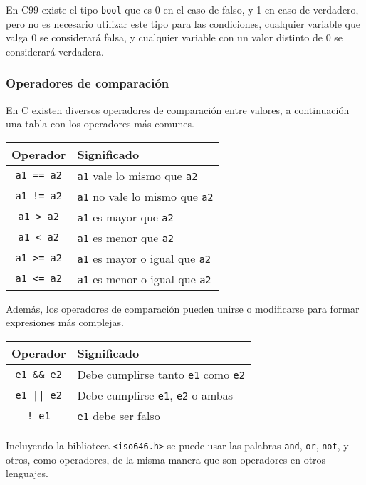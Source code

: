 En C99 existe el tipo \lstinline!bool! que es 0 en el caso de falso, y 1 en
caso de verdadero, pero no es necesario utilizar este tipo para las
condiciones, cualquier variable que valga 0 se considerará falsa, y cualquier
variable con un valor distinto de 0 se considerará verdadera.

\subsubsection{Operadores de comparación}

En C existen diversos operadores de comparación entre valores, a continuación
una tabla con los operadores más comunes.

\begin{tabular}{cl}
Operador & Significado \\
\hline
\lstinline!a1 == a2! & \lstinline!a1! vale lo mismo que \lstinline!a2! \\
\lstinline|a1 != a2| & \lstinline!a1! no vale lo mismo que \lstinline!a2! \\
\lstinline!a1 > a2! & \lstinline!a1! es mayor que \lstinline!a2! \\
\lstinline!a1 < a2! & \lstinline!a1! es menor que \lstinline!a2! \\
\lstinline!a1 >= a2! & \lstinline!a1! es mayor o igual que \lstinline!a2! \\
\lstinline!a1 <= a2! & \lstinline!a1! es menor o igual que \lstinline!a2! \\
\end{tabular}

Además, los operadores de comparación pueden unirse o modificarse para formar
expresiones más complejas.

\begin{tabular}{cl}
Operador & Significado \\
\hline
\lstinline!e1 && e2! & Debe cumplirse tanto \lstinline!e1! como \lstinline!e2! \\
\lstinline!e1 || e2! & Debe cumplirse \lstinline!e1!, \lstinline!e2! o ambas \\
\lstinline?! e1?     & \lstinline!e1! debe ser falso \\
\end{tabular}

Incluyendo la biblioteca \lstinline!<iso646.h>! se puede usar las palabras
\lstinline!and!, \lstinline!or!, \lstinline!not!, y otros, como operadores, de
la misma manera que son operadores en otros lenguajes.

